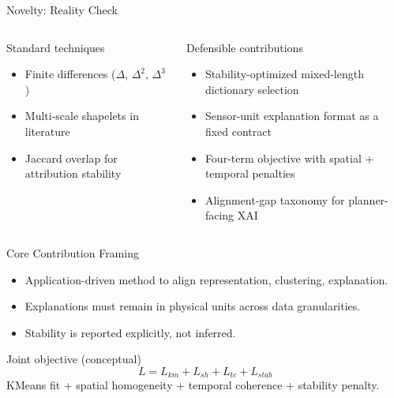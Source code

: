 \documentclass[aspectratio=169]{beamer}
\begin{document}
\begin{frame}{Novelty: Reality Check}
\begin{columns}[T,onlytextwidth]
	\begin{block}{Standard techniques}
		\begin{itemize}\footnotesize\setlength\itemsep{3pt}
			\item Finite differences ($\Delta$, $\Delta^2$, $\Delta^3$)
			\item Multi-scale shapelets in literature
			\item Jaccard overlap for attribution stability
		\end{itemize}
	\end{block}
	\begin{block}{Defensible contributions}
		\begin{itemize}\footnotesize\setlength\itemsep{3pt}
			\item Stability-optimized mixed-length dictionary selection
			\item Sensor-unit explanation format as a fixed contract
			\item Four-term objective with spatial + temporal penalties
			\item Alignment-gap taxonomy for planner-facing XAI
		\end{itemize}
	\end{block}
\end{columns}
\end{frame}

\begin{frame}{Core Contribution Framing}
\begin{itemize}\footnotesize\setlength\itemsep{4pt}
	\item Application-driven method to align representation, clustering, explanation.
	\item Explanations must remain in physical units across data granularities.
	\item Stability is reported explicitly, not inferred.
\end{itemize}
\vspace{0.2cm}
\begin{block}{Joint objective (conceptual)}
	\[
		L = L_{km} + L_{sh} + L_{tc} + L_{stab}
	\]
	\vspace{-0.2cm}
	{\scriptsize KMeans fit + spatial homogeneity + temporal coherence + stability penalty.}
\end{block}
\end{frame}
\end{document}
